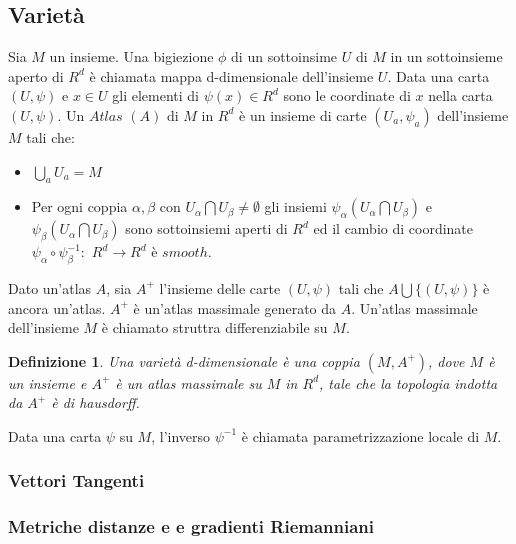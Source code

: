 \documentclass[a4paper, 12pt]{article}
\newtheorem{definition}{Definizione}
\begin{document}
\subsection{Varietà}
Sia $M$ un insieme. Una bigiezione $\phi$ di un sottoinsime $U$ di $M$ in un sottoinsieme aperto di $R^d$ è chiamata mappa d-dimensionale dell'insieme $U$. Data una carta $(U, \psi)$ e $x \in U$ gli elementi di $\psi(x) \in R^d$ sono le coordinate di $x$ nella carta $(U, \psi)$. Un $Atlas$ $(A)$ di $M$ in $R^d$ è un insieme di carte $(U_a, \psi_a)$ dell'insieme $M$ tali che:
\begin{itemize}
    \item $\bigcup_a U_a = M$
    \item Per ogni coppia $\alpha, \beta$ con $U_{\alpha} \bigcap U_{\beta} \neq \emptyset$ gli insiemi $\psi_{\alpha}(U_{\alpha} \bigcap U_{\beta})$ e $\psi_{\beta}(U_{\alpha} \bigcap U_{\beta})$ sono sottoinsiemi aperti di $R^d$ ed il cambio di coordinate $\psi_{\alpha} \circ \psi_{\beta}^{-1}:$ $R^d \to R^d$ è $smooth$.
\end{itemize}
Dato un'atlas $A$, sia $A^+$ l'insieme delle carte $(U, \psi)$ tali che $A \bigcup \{(U, \psi)\}$ è ancora un'atlas. $A^+$ è un'atlas massimale generato da $A$. Un'atlas massimale dell'insieme $M$ è chiamato struttra differenziabile su $M$.
\begin{definition}
Una varietà d-dimensionale è una coppia $(M, A^+)$, dove $M$ è un insieme e $A^+$ è un atlas massimale su $M$ in $R^d$, tale che la topologia indotta da $A^+$ è di hausdorff.
\end{definition}
Data una carta $\psi$ su $M$, l'inverso $\psi^{-1}$ è chiamata parametrizzazione locale di $M$.
\subsubsection{Vettori Tangenti}
\subsubsection{Metriche distanze e e gradienti Riemanniani}
\end{document}
